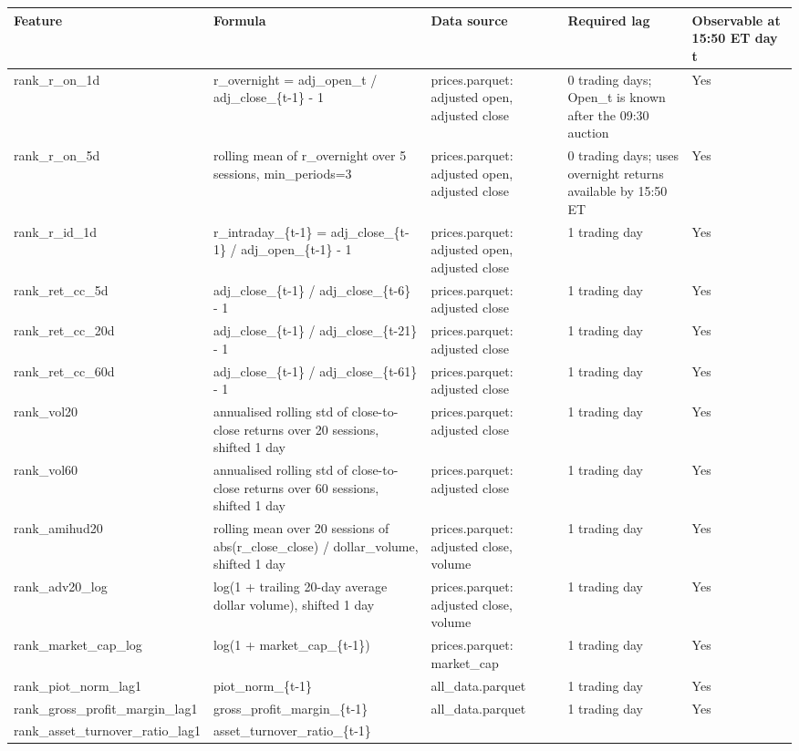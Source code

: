 \documentclass[
]{article}
\begin{document}
\begin{longtable}[]{@{}lllll@{}}
\toprule
Feature & Formula & Data source & Required lag & Observable at 15:50 ET
day t \\
\midrule
\endhead
rank\_r\_on\_1d & r\_overnight = adj\_open\_t / adj\_close\_\{t-1\} - 1
& prices.parquet: adjusted open, adjusted close & 0 trading days;
Open\_t is known after the 09:30 auction & Yes \\
rank\_r\_on\_5d & rolling mean of r\_overnight over 5 sessions,
min\_periods=3 & prices.parquet: adjusted open, adjusted close & 0
trading days; uses overnight returns available by 15:50 ET & Yes \\
rank\_r\_id\_1d & r\_intraday\_\{t-1\} = adj\_close\_\{t-1\} /
adj\_open\_\{t-1\} - 1 & prices.parquet: adjusted open, adjusted close &
1 trading day & Yes \\
rank\_ret\_cc\_5d & adj\_close\_\{t-1\} / adj\_close\_\{t-6\} - 1 &
prices.parquet: adjusted close & 1 trading day & Yes \\
rank\_ret\_cc\_20d & adj\_close\_\{t-1\} / adj\_close\_\{t-21\} - 1 &
prices.parquet: adjusted close & 1 trading day & Yes \\
rank\_ret\_cc\_60d & adj\_close\_\{t-1\} / adj\_close\_\{t-61\} - 1 &
prices.parquet: adjusted close & 1 trading day & Yes \\
rank\_vol20 & annualised rolling std of close-to-close returns over 20
sessions, shifted 1 day & prices.parquet: adjusted close & 1 trading day
& Yes \\
rank\_vol60 & annualised rolling std of close-to-close returns over 60
sessions, shifted 1 day & prices.parquet: adjusted close & 1 trading day
& Yes \\
rank\_amihud20 & rolling mean over 20 sessions of abs(r\_close\_close) /
dollar\_volume, shifted 1 day & prices.parquet: adjusted close, volume &
1 trading day & Yes \\
rank\_adv20\_log & log(1 + trailing 20-day average dollar volume),
shifted 1 day & prices.parquet: adjusted close, volume & 1 trading day &
Yes \\
rank\_market\_cap\_log & log(1 + market\_cap\_\{t-1\}) & prices.parquet:
market\_cap & 1 trading day & Yes \\
rank\_piot\_norm\_lag1 & piot\_norm\_\{t-1\} & all\_data.parquet & 1
trading day & Yes \\
rank\_gross\_profit\_margin\_lag1 & gross\_profit\_margin\_\{t-1\} &
all\_data.parquet & 1 trading day & Yes \\
rank\_asset\_turnover\_ratio\_lag1 & asset\_turnover\_ratio\_\{t-1\} &

\end{longtable}
\end{document}
